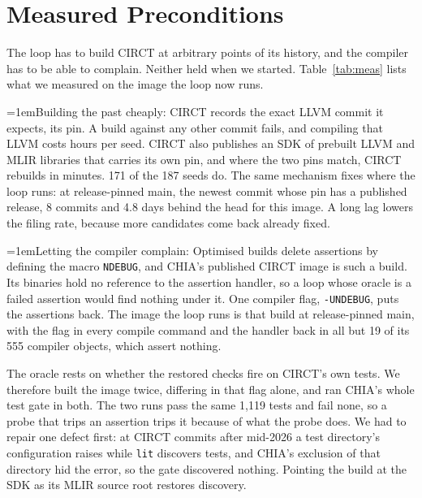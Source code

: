\documentclass[conference]{IEEEtran}
\newcommand{\pointhead}[1]{\par\noindent\hangindent=1em\hangafter=1\makebox[1em][l]{\textbullet}#1:}
\begin{document}
\section{Measured Preconditions}\label{sec:pre}
The loop has to build CIRCT at arbitrary points of its history, and the compiler
has to be able to complain. Neither held when we started. Table~\ref{tab:meas}
lists what we measured on the image the loop now runs.

\pointhead{Building the past cheaply} CIRCT records the exact LLVM commit it
expects, its pin. A build against any other commit fails, and compiling that
LLVM costs hours per seed. CIRCT also publishes an SDK of prebuilt LLVM and MLIR
libraries that carries its own pin, and where the two pins match, CIRCT rebuilds
in minutes. 171 of the 187 seeds do. The same mechanism fixes where the loop
runs: at release-pinned main, the newest commit whose pin has a published
release, 8 commits and 4.8 days behind the head for this image. %
A long lag lowers the filing rate, because more candidates come back already
fixed.

\pointhead{Letting the compiler complain} Optimised builds delete assertions by
defining the macro \texttt{NDEBUG}, and CHIA's published CIRCT image is such a
build. Its binaries hold no reference to the assertion handler, so a loop whose
oracle is a failed assertion would find nothing under it. One compiler flag,
\texttt{-UNDEBUG}, puts the assertions back. The image the loop runs is that
build at release-pinned main, with the flag in every compile command and the
handler back in all but 19 of its 555 compiler objects, which assert nothing. %

The oracle rests on whether the restored checks fire on CIRCT's own tests. We
therefore built the image twice, differing in that flag alone, and ran CHIA's
whole test gate in both. The two runs pass the same 1,119 tests and fail none, %
so a probe that trips an assertion trips it because of what the probe does. We
had to repair one defect first: at CIRCT commits after mid-2026 a test
directory's configuration raises while \texttt{lit} discovers tests, and CHIA's
exclusion of that directory hid the error, so the gate discovered nothing.
Pointing the build at the SDK as its MLIR source root restores discovery. %
\end{document}
